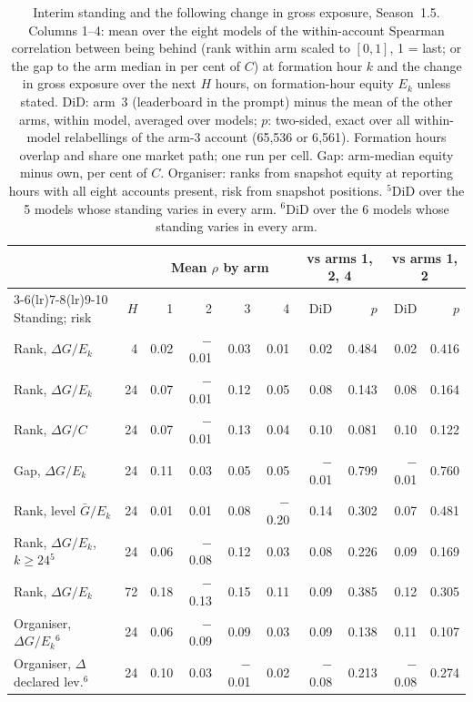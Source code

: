 \begin{table}[htbp]
\centering
\caption{Interim standing and the following change in gross exposure, Season~1.5.
Columns 1--4: mean over the eight models of the within-account Spearman
correlation between being behind (rank within arm scaled to $[0,1]$, 1 = last;
or the gap to the arm median in per cent of $C$) at formation hour $k$ and the
change in gross exposure over the next $H$ hours, on formation-hour equity
$E_k$ unless stated. DiD: arm~3 (leaderboard in the prompt) minus the mean of
the other arms, within model, averaged over models; $p$: two-sided, exact over
all within-model relabellings of the arm-3 account (65{,}536 or 6{,}561). Formation
hours overlap and share one market path; one run per cell. Gap: arm-median
equity minus own, per cent of $C$. Organiser: ranks from snapshot equity at
reporting hours with all eight accounts present, risk from snapshot
positions. $^{5}$DiD over the 5 models whose standing varies in every arm. $^{6}$DiD over the 6 models whose standing varies in every arm.}
\label{tab:tournament}
\footnotesize
\setlength{\tabcolsep}{4pt}
\begin{tabular}{lrrrrrrrrr}
\toprule
 & & \multicolumn{4}{c}{Mean $\rho$ by arm} & \multicolumn{2}{c}{vs arms 1, 2, 4} & \multicolumn{2}{c}{vs arms 1, 2} \\
\cmidrule(lr){3-6}\cmidrule(lr){7-8}\cmidrule(lr){9-10}
Standing; risk & $H$ & 1 & 2 & 3 & 4 & DiD & $p$ & DiD & $p$ \\
\midrule
Rank, $\Delta G/E_k$ & 4 & 0.02 & \ensuremath{-}0.01 & 0.03 & 0.01 & 0.02 & 0.484 & 0.02 & 0.416 \\
Rank, $\Delta G/E_k$ & 24 & 0.07 & \ensuremath{-}0.01 & 0.12 & 0.05 & 0.08 & 0.143 & 0.08 & 0.164 \\
Rank, $\Delta G/C$ & 24 & 0.07 & \ensuremath{-}0.01 & 0.13 & 0.04 & 0.10 & 0.081 & 0.10 & 0.122 \\
Gap, $\Delta G/E_k$ & 24 & 0.11 & 0.03 & 0.05 & 0.05 & \ensuremath{-}0.01 & 0.799 & \ensuremath{-}0.01 & 0.760 \\
Rank, level $\bar G/E_k$ & 24 & 0.01 & 0.01 & 0.08 & \ensuremath{-}0.20 & 0.14 & 0.302 & 0.07 & 0.481 \\
Rank, $\Delta G/E_k$, $k\ge24$$^{5}$ & 24 & 0.06 & \ensuremath{-}0.08 & 0.12 & 0.03 & 0.08 & 0.226 & 0.09 & 0.169 \\
Rank, $\Delta G/E_k$ & 72 & 0.18 & \ensuremath{-}0.13 & 0.15 & 0.11 & 0.09 & 0.385 & 0.12 & 0.305 \\
Organiser, $\Delta G/E_k$$^{6}$ & 24 & 0.06 & \ensuremath{-}0.09 & 0.09 & 0.03 & 0.09 & 0.138 & 0.11 & 0.107 \\
Organiser, $\Delta$ declared lev.$^{6}$ & 24 & 0.10 & 0.03 & \ensuremath{-}0.01 & 0.02 & \ensuremath{-}0.08 & 0.213 & \ensuremath{-}0.08 & 0.274 \\
\bottomrule
\end{tabular}
\end{table}
